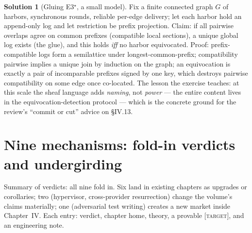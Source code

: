 \documentclass[11pt,a4paper]{article}
\theoremstyle{definition}
\newtheorem{sol}{Solution}
\theoremstyle{remark}
\newcommand{\grade}[1]{\textsc{[#1]}}
\begin{document}
\begin{sol}[Gluing E3$^\star$, a small model]\label{sol:glue3}
Fix a finite connected graph $G$ of harbors, synchronous rounds, reliable per-edge delivery; let each harbor hold an append-only log and let restriction be prefix projection. Claim: if all pairwise overlaps agree on common prefixes (compatible local sections), a unique global log exists (the glue), and this holds \emph{iff} no harbor equivocated. Proof: prefix-compatible logs form a semilattice under longest-common-prefix; compatibility pairwise implies a unique join by induction on the graph; an equivocation is exactly a pair of incomparable prefixes signed by one key, which destroys pairwise compatibility on some edge once co-located. The lesson the exercise teaches: at this scale the sheaf language adds \emph{naming}, not \emph{power} --- the entire content lives in the equivocation-detection protocol --- which is the concrete ground for the review's ``commit or cut'' advice on \S IV.13.
\end{sol}

\section{Nine mechanisms: fold-in verdicts and undergirding}\label{sec:mechs}

Summary of verdicts: all nine fold in. Six land in existing chapters as upgrades or corollaries; two (hypervisor, cross-provider resurrection) change the volume's claims materially; one (adversarial test writing) creates a new market inside Chapter~IV. Each entry: verdict, chapter home, theory, a provable \grade{target}, and an engineering note.
\end{document}
